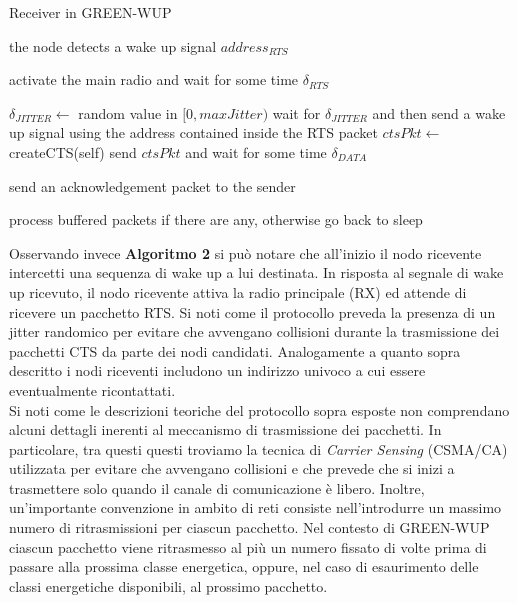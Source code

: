 \documentclass[binding=0.6cm,TFA]{sapthesis}
\begin{document}
\begin{algorithm}
    \caption{Receiver in GREEN-WUP}
    \begin{algorithmic}
        \REQUIRE the node detects a wake up signal $address_{RTS}$

            \STATE activate the main radio and wait for some time $\delta_{RTS}$

                \STATE $\delta_{JITTER} \leftarrow$ random value in $[0,maxJitter)$
                \STATE wait for $\delta_{JITTER}$ and then send a wake up signal using the address contained inside the RTS packet
                \STATE $ctsPkt \leftarrow$ createCTS(self)
                \STATE send $ctsPkt$ and wait for some time $\delta_{DATA}$

                    \STATE send an acknowledgement packet to the sender
                \ENDIF
            \ENDIF

            \STATE process buffered packets if there are any, otherwise go back to sleep
        
    \end{algorithmic}
\end{algorithm}

Osservando invece \textbf{Algoritmo 2} si può notare che all'inizio il nodo ricevente intercetti una sequenza di wake up a lui destinata. In risposta
al segnale di wake up ricevuto, il nodo ricevente attiva la radio principale (RX) ed attende di ricevere un pacchetto RTS. Si noti come il
protocollo preveda la presenza di un jitter randomico per evitare che avvengano collisioni durante la trasmissione dei pacchetti CTS da parte
dei nodi candidati. Analogamente a quanto sopra descritto i nodi riceventi includono un indirizzo univoco a cui essere eventualmente ricontattati.\\

Si noti come le descrizioni teoriche del protocollo sopra esposte non comprendano alcuni dettagli inerenti al meccanismo di trasmissione
dei pacchetti. In particolare, tra questi questi troviamo la tecnica di \emph{Carrier Sensing} (CSMA/CA) utilizzata per evitare che avvengano collisioni
e che prevede che si inizi a trasmettere solo quando il canale di comunicazione è libero. Inoltre, un'importante convenzione in ambito di reti consiste
nell'introdurre un massimo numero di ritrasmissioni per ciascun pacchetto. Nel contesto di GREEN-WUP ciascun pacchetto viene ritrasmesso
al più un numero fissato di volte prima di passare alla prossima classe energetica, oppure, nel caso di esaurimento delle classi energetiche
disponibili, al prossimo pacchetto.
\end{document}
